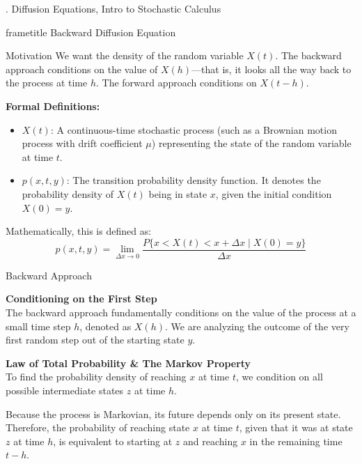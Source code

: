 \documentclass{beamer}
\begin{document}
	\begin{frame}
	. Diffusion Equations, Intro to Stochastic Calculus
	\end{frame}

\begin{frame}
\begin{beamercolorbox}[wd=\paperwidth,sep=0.3cm,center]{frametitle}
Backward Diffusion Equation
\end{beamercolorbox}
\end{frame}
\begin{frame}{Motivation}
We want the density of the random variable $X(t)$. The backward approach conditions on the value of $X(h)$—that is, it looks all the way back to the process at time $h$. The forward approach conditions on $X(t - h)$.

\vspace{0.3cm}
\textbf{Formal Definitions:}
\begin{itemize}
    \item $X(t)$: A continuous-time stochastic process (such as a Brownian motion process with drift coefficient $\mu$) representing the state of the random variable at time $t$.
    \item $p(x, t, y)$: The transition probability density function. It denotes the probability density of $X(t)$ being in state $x$, given the initial condition $X(0) = y$.
\end{itemize}

\vspace{0.3cm}
Mathematically, this is defined as:
$$p(x, t, y) = \lim_{\Delta x \to 0} \frac{P\{x < X(t) < x + \Delta x \mid X(0) = y\}}{\Delta x}$$
\end{frame}

\begin{frame}{Backward Approach}

\textbf{Conditioning on the First Step} \\
The backward approach fundamentally conditions on the value of the process at a small time step $h$, denoted as $X(h)$. We are analyzing the outcome of the very first random step out of the starting state $y$.

\vspace{0.3cm}


\textbf{Law of Total Probability \& The Markov Property} \\
To find the probability density of reaching $x$ at time $t$, we condition on all possible intermediate states $z$ at time $h$. 

Because the process is Markovian, its future depends only on its present state. Therefore, the probability of reaching state $x$ at time $t$, given that it was at state $z$ at time $h$, is equivalent to starting at $z$ and reaching $x$ in the remaining time $t - h$.

\end{frame}
\end{document}

